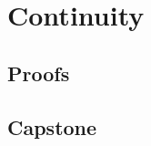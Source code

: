 \chapter{Continuity}
\label{chap:continuity}

\LRAExcludeFromPrintEditionBegin
\section*{Proofs}

\section*{Capstone}

\LRAExcludeFromPrintEditionEnd
